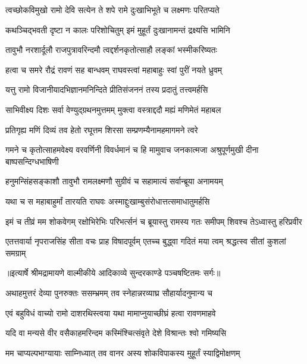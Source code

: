 \twolineshloka
{त्वच्छोकविमुखो रामो देवि सत्येन ते शपे}
{रामे दुःखाभिभूते च लक्ष्मणः परितप्यते} %

\twolineshloka
{कथञ्चिद्भवती दृष्टा न कालः परिशोचितुम्}
{इमं मुहूर्तं दुःखानामन्तं द्रक्ष्यसि भामिनि} %

\twolineshloka
{तावुभौ नरशार्दूलौ राजपुत्रावरिन्दमौ}
{त्वद्दर्शनकृतोत्साहौ लङ्कां भस्मीकरिष्यतः} %

\twolineshloka
{हत्वा च समरे रौद्रं रावणं सह बान्धवम्}
{राघवस्त्वां महाबाहुः स्वां पुरीं नयते ध्रुवम्} %

\twolineshloka
{यत्तु रामो विजानीयादभिज्ञानमनिन्दिते}
{प्रीतिसंजननं तस्य प्रदातुं तत्त्वमर्हसि} %

\twolineshloka
{साभिवीक्ष्य दिशः सर्वा वेण्युद्ग्रथनमुत्तमम्}
{मुक्त्वा वस्त्राद्ददौ मह्यं मणिमेतं महाबल} %

\twolineshloka
{प्रतिगृह्य मणिं दिव्यं तव हेतो रघूत्तम}
{शिरसा सम्प्रणम्यैनामहमागमने त्वरे} %

\threelineshloka
{गमने च कृतोत्साहमवेक्ष्य वरवर्णिनी}
{विवर्धमानं च हि मामुवाच जनकात्मजा}
{अश्रुपूर्णमुखी दीना बाष्पसन्दिग्धभाषिणी} %

\twolineshloka
{हनुमन्सिंहसङ्काशौ तावुभौ रामलक्ष्मणौ}
{सुग्रीवं च सहामात्यं सर्वान्ब्रूया अनामयम्} %

\twolineshloka
{यथा च स महाबाहुर्मां तारयति राघवः}
{अस्माद्दुःखाम्बुसंरोधात्तत्समाधातुमर्हसि} %

\fourlineindentedshloka
{इमं च तीव्रं मम शोकवेगम्}
{रक्षोभिरेभिः परिभर्त्सनं च}
{ब्रूयास्तु रामस्य गतः समीपम्}
{शिवश्च तेऽध्वास्तु हरिप्रवीर} %

\fourlineindentedshloka
{एतत्तवार्या नृपराजसिंह}
{सीता वचः प्राह विषादपूर्वम्}
{एतच्च बुद्ध्वा गदितं मया त्वम्}
{श्रद्धत्स्व सीतां कुशलां समग्राम्} %


{॥इत्यार्षे श्रीमद्रामायणे वाल्मीकीये आदिकाव्ये सुन्दरकाण्डे पञ्चषष्टितमः सर्गः॥}


\twolineshloka
{अथाहमुत्तरं देव्या पुनरुक्तः ससम्भ्रमम्}
{तव स्नेहान्नरव्याघ्र सौहार्यादनुमान्य च} %

\twolineshloka
{एवं बहुविधं वाच्यो रामो दाशरथिस्त्वया}
{यथा मामाप्नुयाच्छीघ्रं हत्वा रावणमाहवे} %

\twolineshloka
{यदि वा मन्यसे वीर वसैकाहमरिन्दम}
{कस्मिंश्चित्संवृते देशे विश्रान्तः श्वो गमिष्यसि} %

\twolineshloka
{मम चाप्यल्पभाग्यायाः साम्निध्यात् तव वानर}
{अस्य शोकविपाकस्य मुहूर्तं स्याद्विमोक्षणम्} %

